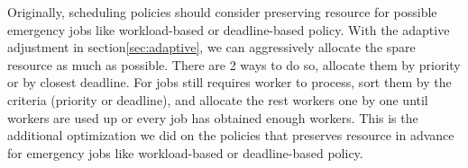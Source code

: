 Originally, scheduling policies should consider preserving resource for
possible emergency jobs like workload-based or deadline-based policy.
With the adaptive adjustment in section\ref{sec:adaptive}, we can
aggressively allocate the spare resource as much as possible.
There are 2 ways to do so, allocate them by priority or by closest
deadline.
For jobs still requires worker to process, sort them by the
criteria (priority or deadline), and allocate the rest workers one by
one until workers are used up or every job has obtained enough workers.
This is the additional optimization we did on the policies that
preserves resource in advance for emergency jobs like workload-based or
deadline-based policy.
